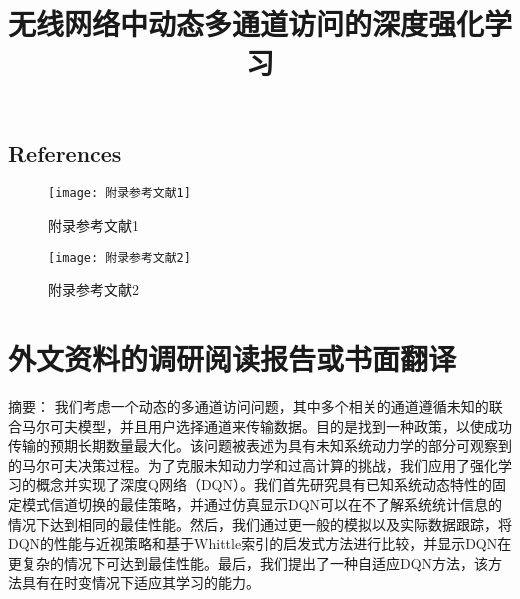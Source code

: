 \section*{References}

\begin{figure}[h]
	\centering
	\texttt{[image: 附录参考文献1]}
	\caption{附录参考文献1}
\end{figure}

\begin{figure}[h]
	\centering
	\texttt{[image: 附录参考文献2]}
	\caption{附录参考文献2}
\end{figure}

\chapter{外文资料的调研阅读报告或书面翻译}

\title{无线网络中动态多通道访问的深度强化学习}

{\heiti 摘要：} 我们考虑一个动态的多通道访问问题，其中多个相关的通道遵循未知的联合马尔可夫模型，并且用户选择通道来传输数据。目的是找到一种政策，以使成功传输的预期长期数量最大化。该问题被表述为具有未知系统动力学的部分可观察到的马尔可夫决策过程。为了克服未知动力学和过高计算的挑战，我们应用了强化学习的概念并实现了深度Q网络（DQN）。我们首先研究具有已知系统动态特性的固定模式信道切换的最佳策略，并通过仿真显示DQN可以在不了解系统统计信息的情况下达到相同的最佳性能。然后，我们通过更一般的模拟以及实际数据跟踪，将DQN的性能与近视策略和基于Whittle索引的启发式方法进行比较，并显示DQN在更复杂的情况下可达到最佳性能。最后，我们提出了一种自适应DQN方法，该方法具有在时变情况下适应其学习的能力。

